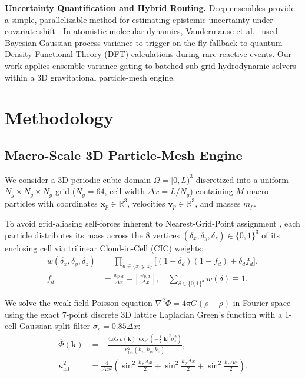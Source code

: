 \documentclass[10pt,twocolumn,letterpaper]{article}
\begin{document}
\textbf{Uncertainty Quantification and Hybrid Routing.} Deep ensembles provide a simple, parallelizable method for estimating epistemic uncertainty under covariate shift \cite{lakshminarayanan2017}. In atomistic molecular dynamics, Vandermause et al.\ \cite{vandermause2020} used Bayesian Gaussian process variance to trigger on-the-fly fallback to quantum Density Functional Theory (DFT) calculations during rare reactive events. Our work applies ensemble variance gating to batched sub-grid hydrodynamic solvers within a 3D gravitational particle-mesh engine.

\section{Methodology}

\subsection{Macro-Scale 3D Particle-Mesh Engine}
We consider a 3D periodic cubic domain $\Omega = [0, L)^3$ discretized into a uniform $N_g \times N_g \times N_g$ grid ($N_g = 64$, cell width $\Delta x = L/N_g$) containing $M$ macro-particles with coordinates $\mathbf{x}_p \in \mathbb{R}^3$, velocities $\mathbf{v}_p \in \mathbb{R}^3$, and masses $m_p$.

To avoid grid-aliasing self-forces inherent to Nearest-Grid-Point assignment \cite{hockney1988}, each particle distributes its mass across the 8 vertices $(\delta_x, \delta_y, \delta_z) \in \{0,1\}^3$ of its enclosing cell via trilinear Cloud-in-Cell (CIC) weights:
\begin{equation}
\begin{aligned}
    w(\delta_x, \delta_y, \delta_z) &= \prod_{d \in \{x,y,z\}} \Big[(1 - \delta_d)(1 - f_d) + \delta_d f_d\Big], \\
    f_d &= \frac{x_{p,d}}{\Delta x} - \left\lfloor \frac{x_{p,d}}{\Delta x} \right\rfloor, \quad \sum_{\delta \in \{0,1\}^3} w(\delta) \equiv 1.
\end{aligned}
\label{eq:cic}
\end{equation}

We solve the weak-field Poisson equation $\nabla^2 \Phi = 4\pi G (\rho - \bar{\rho})$ in Fourier space using the exact 7-point discrete 3D lattice Laplacian Green's function \cite{hockney1988} with a 1-cell Gaussian split filter $\sigma_s = 0.85\Delta x$:
\begin{equation}
\begin{aligned}
    \hat{\Phi}(\mathbf{k}) &= -\frac{4\pi G \, \hat{\rho}(\mathbf{k}) \, \exp\left(-\frac{1}{2}|\mathbf{k}|^2 \sigma_s^2\right)}{\kappa_{\text{lat}}^2(k_x, k_y, k_z)}, \\
    \kappa_{\text{lat}}^2 &= \frac{4}{\Delta x^2}\left(\sin^2\frac{k_x\Delta x}{2} + \sin^2\frac{k_y\Delta x}{2} + \sin^2\frac{k_z\Delta x}{2}\right).
\end{aligned}
\label{eq:greens}
\end{equation}
\end{document}
